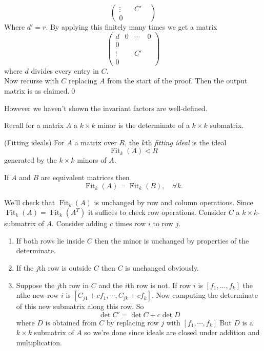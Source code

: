 \documentclass{article}
\newcommand{\nrm}{\triangleleft}
\DeclareMathOperator{\Fit}{Fit}
\begin{document}
\begin{itemize}
\[\begin{pmatrix}
	  \vdots & & C' & \\
	  0 & & & 
  \end{pmatrix}
\]
Where $ d'=r $. By applying this finitely many times we get a matrix
\[
  \begin{pmatrix}
	  d & 0 & \cdots & 0 \\
	  0 & & & \\
	  \vdots & & C' & \\
	  0 & & &
  \end{pmatrix}
\]
where $ d $ divides every entry in $ C $.\\
Now recurse with $ C $ replacing $ A $ from the start of the proof. Then the output matrix is as claimed.\qed
\begin{remark}
  However we haven't shown the invariant factors are well-defined.
\end{remark}
Recall for a matrix $ A $ a $ k\times k $ minor is the determinate of a $ k\times k $ submatrix.
\begin{definition}
	(Fitting ideals) For $ A $ a matrix over $ R $, the $ k $th \textit{fitting ideal} is the ideal 
	\[
	  \Fit_k(A)\nrm R
	\]
	generated by the $ k\times k $ minors of $ A $.
\end{definition}
\begin{proposition}
  If $ A $ and $ B $ are equivalent matrices then 
  \[
    \Fit_k(A)=\Fit_k(B),\quad \forall k.
  \]
\end{proposition}
\pf We'll check that $ \Fit_k(A) $ is unchanged by row and column operations. Since $ \Fit_k(A)=\Fit_k(A^T) $ it suffices to check row operations. Consider $ C $ a $ k\times k $-submatrix of $ A $. Consider adding $ c $ times row $ i $ to row $ j $.
\begin{enumerate}
	\item If both rows lie inside $ C $ then the minor is unchanged by properties of the determinate.
	\item If the $ j $th row is outside $ C $ then $ C $ is unchanged obviously.
	\item Suppose the $ j $th row in $ C $ and the $ i $th row is not. If row $ i $ is $ [f_1,\dots, f_k] $ the nthe new row $ i $ is $ [C_{j1}+cf_1,\cdots, C_{jk}+cf_k] $. Now computing the determinate of this new submatrix along this row. So
		\[
		  \det C'=\det C+c\det D
		\]
		where $ D $ is obtained from $ C $ by replacing row $ j $ with $ [f_1,\cdots, f_k] $ But $ D $ is a $ k\times k $ submatrix of $ A $ so we're done since ideals are closed under addition and multiplication.
\end{enumerate}

\end{itemize}
\end{document}
